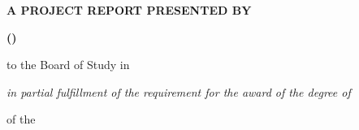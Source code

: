\title{}
\date{}
\author{}

\begin{titlepage}
    \begin{center}
    
    \begin{spacing}{1}
    {\fontsize{14pt}{0pt}\selectfont
    \textbf{\expandafter\MakeUppercase{\projectTitle}}}
    \end{spacing}
    
    \vspace{2.5cm}
    
    \textbf{\uppercase{a project report presented by}}
    
    \vspace{1.0cm}
    
    \begin{spacing}{1}
    \textbf{\uppercase{\expandafter\MakeUppercase{\nameWithInitials}}}
    \linebreak
    \textbf{\uppercase{\expandafter\MakeUppercase{(\registrationNumber)}}}
    \end{spacing}

    \vspace{1.0cm}
    
    \begin{spacing}{1.5}
    {to the Board of Study in}
    \linebreak
    \textbf{\expandafter\MakeUppercase{\departmentName}}
    
    \vspace{2.5cm}

    {\textit{ in partial fulfillment of the requirement \linebreak for the award of the degree of}}
    \end{spacing}
    
    \vspace{2.5cm}
    
    {\textbf{\degreeName}}
    
    \vspace{2.5cm}
    
    {of the}
    
    \vspace*{\fill}
    
    \begin{spacing}{1.5}
    {\expandafter\MakeUppercase{{\textbf{\universityName \linebreak \universityCountry \linebreak \publicationYear}}}}
    \end{spacing}
    
    \end{center}
    \thispagestyle{empty}
\end{titlepage}

